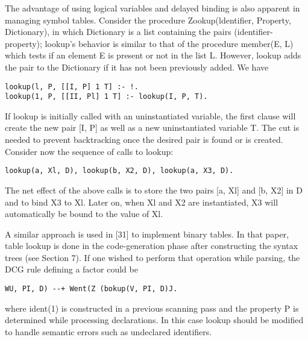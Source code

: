 The advantage of using logical variables and delayed binding is also
apparent in managing symbol tables. Consider the procedure Zookup(ldentifier,
Property, Dictionary), in which Dictionary is a list containing the pairs
(identifier-property); lookup’s behavior is similar to that of the procedure
member(E, L) which tests if an element E is present or not in the list L. However,
lookup adds the pair to the Dictionary if it has not been previously added. We
have
\begin{verbatim}
lookup(l, P, [[I, P] 1 T] :- !.
lookup(1, P, [[II, Pl] 1 T] :- lookup(I, P, T).
\end{verbatim}
If lookup is initially called with an uninstantiated variable, the first clause will
create the new pair [I, P] as well as a new uninstantiated variable T. The cut is
needed to prevent backtracking once the desired pair is found or is created. 
Consider now the sequence of calls to lookup:
\begin{verbatim}
lookup(a, Xl, D), lookup(b, X2, D), lookup(a, X3, D). 
\end{verbatim}

The net effect of the above calls is to store the two pairs [a, Xl] and [b, X2] in
D and to bind X3 to Xl. Later on, when Xl and X2 are instantiated, X3 will
automatically be bound to the value of Xl. 

A similar approach is used in [31] to implement binary tables. In that paper,
table lookup is done in the code-generation phase after constructing the syntax
trees (see Section 7). If one wished to perform that operation while parsing, the
DCG rule defining a factor could be
\begin{verbatim}
WU, PI, D) --+ Went(Z (bokup(V, PI, D)J. 
\end{verbatim}
where ident(1) is constructed in a previous scanning pass and the property P is
determined while processing declarations. In this case lookup should be modified
to handle semantic errors such as undeclared identifiers. 

